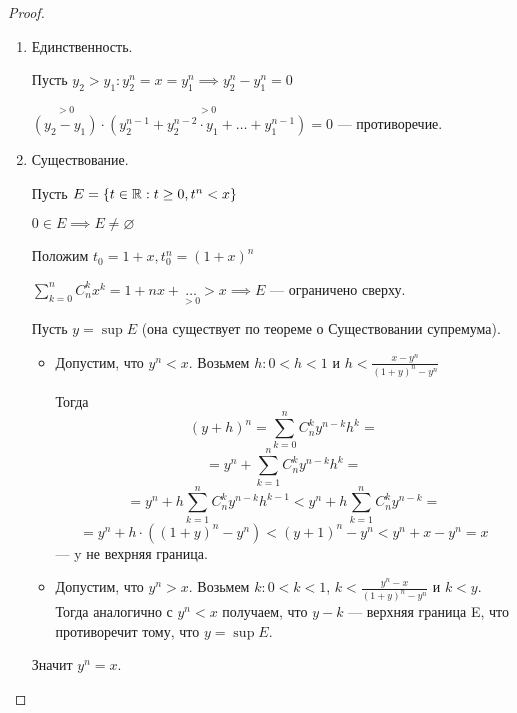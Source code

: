 \begin{proof}
    \begin{enumerate}
        \item Единственность.
        
        Пусть $y_2 > y_1: y^{n}_{2} = x = y^{n}_{1} \implies y^{n}_{2} - y^{n}_{1} = 0$

        $\overset{> 0}{(y_2 - y_1)} \cdot \overset{> 0}{(y^{n-1}_{2} + y^{n-2}_{2} \cdot y_1 + \ldots + y^{n-1}_{1})} = 0$ --- противоречие.


        \item Существование.
        
        Пусть $E = \{t \in \mathbb{R}: t \geq 0, t^n < x\}$

        $0 \in E \implies E \neq \varnothing$

        Положим $t_0 = 1 + x, t_{0}^{n} = (1 + x)^n$

        $\sum_{k = 0}^{n} C_{n}^{k} x^k = 1 + nx + \underset{> 0}{\dots} > x \implies E$ --- ограничено сверху.

        Пусть $y = \sup E$ (она существует по теореме о Существовании супремума). 
        
        \begin{itemize}
        
            \item Допустим, что $y^n < x$. Возьмем $h: 0 < h < 1$ и $h < \frac{x - y^{n}}{(1+y)^{n} - y^n}$
            
            Тогда \[(y + h)^n = \sum^{n}_{k = 0} C_{n}^{k} y^{n - k}h^{k} = \]
            \[ =y^n + \sum^{n}_{k = 1} C_{n}^{k} y^{n - k}h^{k} = \] 
            \[ =y^n + h\sum^{n}_{k = 1} C_{n}^{k} y^{n - k}h^{k-1} < y^n + h \sum_{k = 1}^{n} C_{n}^{k}y^{n-k} = \] 
            \[ =y^n + h \cdot ((1 + y)^n - y^n) <(y + 1)^n - y^n < y^n + x - y^n = x\] --- y не вехрняя граница.

            \item Допустим, что $y^n > x$. Возьмем $k: 0 < k < 1$, 
            $k < \frac{y^{n} - x}{(1 + y)^{n} - y^{n}}$ и  $k < y$. Тогда аналогично с $y^n < x$ получаем, что $y - k$ --- верхняя граница E, что противоречит тому, что $y = \sup E$. 
        \end{itemize}
        Значит $y^n = x$.
    \end{enumerate}
\end{proof}